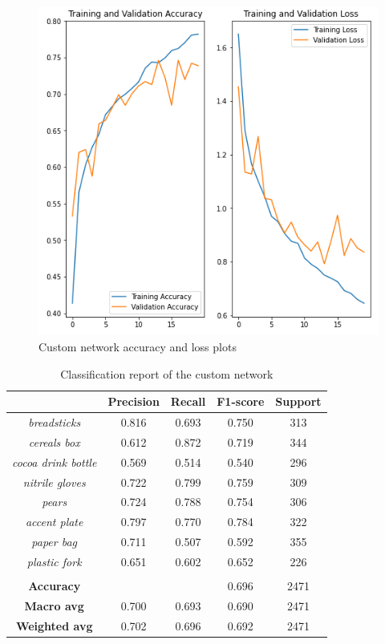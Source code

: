 \documentclass[11pt]{article}
\begin{document}
	\begin{figure}[H]
		\centering
		\includegraphics[width=.8\textwidth]{assets/custom_network_plots.png}
		\caption{Custom network accuracy and loss plots}
	\end{figure}

	\begin{table}[H]
		\centering	
		\begin{tabular}{c|c|c|c|c}
			\hline
			& \textbf{Precision} & \textbf{Recall} & \textbf{F1-score} & \textbf{Support} \\
			\hline
			\textit{breadsticks} & 0.816 & 0.693 & 0.750 & 313 \\
			\textit{cereals box} & 0.612 & 0.872 & 0.719 & 344 \\
			\textit{cocoa drink bottle} & 0.569 & 0.514 & 0.540 & 296 \\
			\textit{nitrile gloves} & 0.722 & 0.799 & 0.759 & 309 \\
			\textit{pears} & 0.724 & 0.788 & 0.754 & 306 \\
			\textit{accent plate} & 0.797 & 0.770 & 0.784 & 322 \\
			\textit{paper bag} & 0.711 & 0.507 & 0.592 & 355 \\
			\textit{plastic fork} & 0.651 & 0.602 & 0.652 & 226 \\
			\hline
			\multicolumn{5}{c}{} \\
			\hline
			\textbf{Accuracy} & & & 0.696 & 2471 \\
			\textbf{Macro avg} & 0.700 & 0.693 & 0.690 & 2471 \\
			\textbf{Weighted avg} & 0.702 & 0.696 & 0.692 & 2471 \\
			\hline
		\end{tabular}
		\caption{Classification report of the custom network}
	\end{table}
\end{document}
